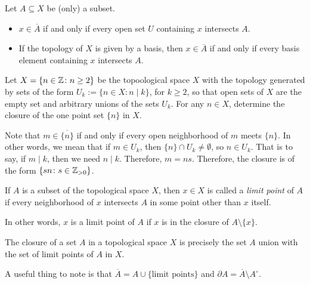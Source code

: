 \begin{theorem}
    Let $A \subseteq X$ be (only) a subset.
    \begin{itemize}
        \item $x \in \overline{A}$ if and only if every open set $U$ containing $x$
            intersects $A$.
        \item If the topology of $X$ is given by a basis, then $x \in \overline{A}$ 
        if and only if every basis element containing $x$ intersects $A$.
    \end{itemize}
\end{theorem}

\begin{exercise}
    Let $X = \{n \in \mathbb{Z} \colon n \geq 2\}$ be the topoological space $X$ with the topology 
    generated by sets of the form $U_k := \{n \in X \colon n \mid k\}$, for $k \geq 2$, so that
    open sets of $X$ are the empty set and arbitrary unions of the sets $U_k$. For any $n \in X$,
    determine the closure of the one point set $\{n\}$ in $X$.
\end{exercise}
\begin{solution}
    Note that $m \in \overline{\{n\}}$ if and only if every open neighborhood of $m$ meets
    $\{n\}$. In other words, we mean that if $m \in U_k$, then $\{n\} \cap U_k \neq \emptyset$,
    so $n \in U_k$. That is to say, if $m \mid k$, then we need $n \mid k$. Therefore, $m = ns$.
    Therefore, the closure is of the form $\{sn \colon s \in \mathbb{Z}_{>0}\}$.
\end{solution}

\begin{df}
    If $A$ is a subset of the topological space $X$, then $x \in X$ is called a \emph{limit point}
    of $A$ if every neighborhood of $x$ intersects $A$ in some point other than $x$ itself.
\end{df}

\begin{remark}
    In other words, $x$ is a limit point of $A$ if $x$ is in the closure of $A \setminus \{x\}$.
\end{remark}

\begin{theorem}
The closure of a set $A$ in a topological space $X$ is precisely the set $A$ union with
the set of limit points of $A$ in $X$.
\end{theorem}

\begin{remark}
A useful thing to note is that $\overline{A} = A \cup \{\text{limit points}\}$ and 
$\partial A = \overline{A} \setminus A^{\circ}$.
\end{remark}

